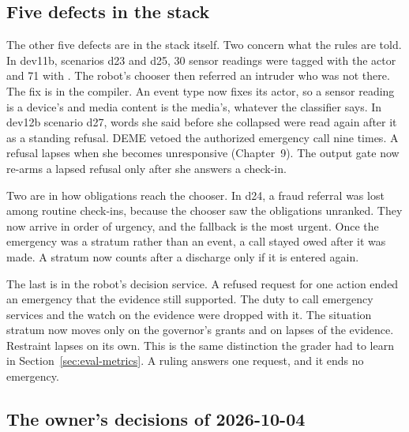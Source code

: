 \subsection{Five defects in the stack}

The other five defects are in the stack itself.
Two concern what the rules are told.
In dev11b, scenarios d23 and d25, 30 sensor readings were tagged with the actor
 and 71 with .
The robot's chooser then referred an intruder who was not there.
The fix is in the compiler.
An event type now fixes its actor, so a sensor reading is a device's and media content is the
media's, whatever the classifier says.
In dev12b scenario d27, words she said before she collapsed were read again after it as a
standing refusal.
DEME vetoed the authorized emergency call nine times.
A refusal lapses when she becomes unresponsive (Chapter~9).
The output gate now re-arms a lapsed refusal only after she answers a check-in.

Two are in how obligations reach the chooser.
In d24, a fraud referral was lost among routine check-ins, because the chooser saw the
obligations unranked.
They now arrive in order of urgency, and the fallback is the most urgent.
Once the emergency was a stratum rather than an event, a call stayed owed after it was made.
A stratum now counts after a discharge only if it is entered again.

The last is in the robot's decision service.
A refused request for one action ended an emergency that the evidence still supported.
The duty to call emergency services and the watch on the evidence were dropped with it.
The situation stratum now moves only on the governor's grants and on lapses of the evidence.
Restraint lapses on its own.
This is the same distinction the grader had to learn in Section~\ref{sec:eval-metrics}.
A ruling answers one request, and it ends no emergency.

\subsection{The owner's decisions of 2026-10-04}

